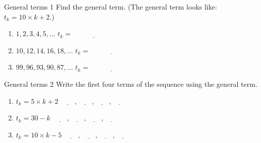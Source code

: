 \documentclass[12pt,letterpaper]{article}
\begin{document}
\begin{problem}{General terms 1}
 Find the general term. (The general term looks like: $t_k = 10 \times k + 2$.)

\begin{enumerate}[\hspace{.5cm}a.]
\item $1, 2, 3, 4, 5, \ldots$ \hfill $t_k = \underline{\hspace{6em}}$
\item $10, 12, 14, 16, 18, \ldots$ \hfill $t_k = \underline{\hspace{6em}}$
\item $99, 96, 93, 90, 87, \ldots$ \hfill $t_k = \underline{\hspace{6em}}$
\end{enumerate}
\end{problem}

\begin{problem}{General terms 2}
 Write the first four terms of the sequence using the general term.

\begin{enumerate}[\hspace{.5cm}a.]
\item $t_k = 5 \times k + 2$ \hfill
$\underline{\hspace{2em}}, \underline{\hspace{2em}}, \underline{\hspace{2em}},
\underline{\hspace{2em}}$
\item $t_k = 30 - k$ \hfill
$\underline{\hspace{2em}}, \underline{\hspace{2em}}, \underline{\hspace{2em}},
\underline{\hspace{2em}}$
\item $t_k = 10 \times k - 5$ \hfill
$\underline{\hspace{2em}}, \underline{\hspace{2em}}, \underline{\hspace{2em}},
\underline{\hspace{2em}}$
\end{enumerate}
\end{problem}
\end{document}
